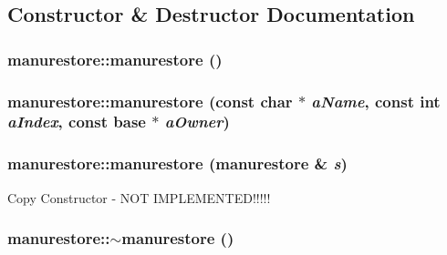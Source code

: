 \subsection{Constructor \& Destructor Documentation}
\hypertarget{classmanurestore_a02f7143140593b6bdcb8d78a0430eaae}{
\subsubsection[{manurestore}]{\setlength{\rightskip}{0pt plus 5cm}manurestore::manurestore ()}}
\label{classmanurestore_a02f7143140593b6bdcb8d78a0430eaae}
\hypertarget{classmanurestore_a4dd27dc7412d75d1b50441280aab6d88}{
\subsubsection[{manurestore}]{\setlength{\rightskip}{0pt plus 5cm}manurestore::manurestore (const char $\ast$ {\em aName}, \/  const int {\em aIndex}, \/  const {\bf base} $\ast$ {\em aOwner})}}
\label{classmanurestore_a4dd27dc7412d75d1b50441280aab6d88}
\hypertarget{classmanurestore_a737792bf42c55f07092c3aed9f5330b6}{
\subsubsection[{manurestore}]{\setlength{\rightskip}{0pt plus 5cm}manurestore::manurestore ({\bf manurestore} \& {\em s})}}
\label{classmanurestore_a737792bf42c55f07092c3aed9f5330b6}
Copy Constructor -\/ NOT IMPLEMENTED!!!!! \hypertarget{classmanurestore_a02a248d96a0dd55d54926e44f51f253a}{
\subsubsection[{$\sim$manurestore}]{\setlength{\rightskip}{0pt plus 5cm}manurestore::$\sim$manurestore ()}}
\label{classmanurestore_a02a248d96a0dd55d54926e44f51f253a}


